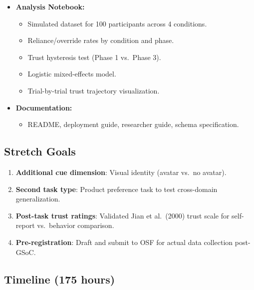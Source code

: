 \documentclass[12pt]{article}
\begin{document}
\begin{itemize}
\item \textbf{Analysis Notebook:}
\begin{itemize}
\item Simulated dataset for 100 participants across 4 conditions.
\item Reliance/override rates by condition and phase.
\item Trust hysteresis test (Phase 1 vs.\ Phase 3).
\item Logistic mixed-effects model.
\item Trial-by-trial trust trajectory visualization.
\end{itemize}

\item \textbf{Documentation:}
\begin{itemize}
\item README, deployment guide, researcher guide, schema specification.
\end{itemize}
\end{itemize}

\subsection{Stretch Goals}

\begin{enumerate}
\item \textbf{Additional cue dimension}: Visual identity (avatar vs.\ no avatar).
\item \textbf{Second task type}: Product preference task to test cross-domain generalization.
\item \textbf{Post-task trust ratings}: Validated Jian et al.\ (2000) trust scale for self-report vs.\ behavior comparison.
\item \textbf{Pre-registration}: Draft and submit to OSF for actual data collection post-GSoC.
\end{enumerate}

\subsection{Timeline (175 hours)}
\end{document}
